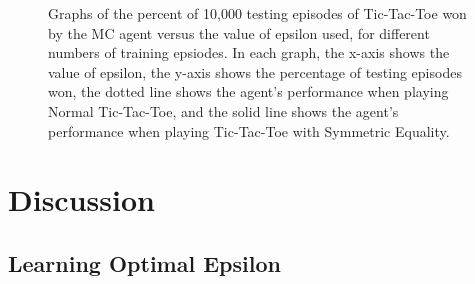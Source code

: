 \documentclass[11pt,a4paper]{report}
\begin{document}
\begin{figure}

    \caption{Graphs of the percent of 10,000 testing episodes of Tic-Tac-Toe won by the MC agent versus the value of epsilon used, for different numbers of training epsiodes. In each graph, the x-axis shows the value of epsilon, the y-axis shows the percentage of testing episodes won, the dotted line shows the agent's performance when playing Normal Tic-Tac-Toe, and the solid line shows the agent's performance when playing Tic-Tac-Toe with Symmetric Equality.}
    \label{fig:tictactoe-normal-vs-symmetric-equality}
\end{figure}


\chapter{Discussion}

\section{Learning Optimal Epsilon}
\end{document}
